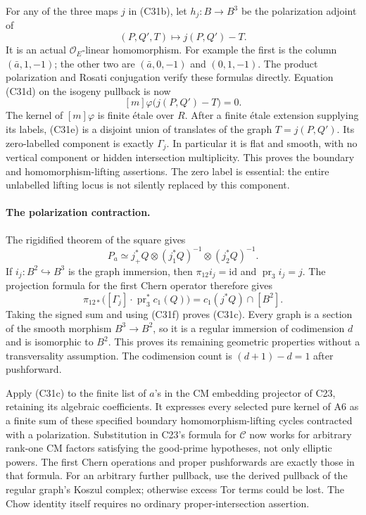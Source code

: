 For any of the three maps $j$ in (C31b), let
$h_j:B\to B^3$ be the polarization adjoint of
\[
                 (P,Q',T)\longmapsto j(P,Q')-T.
\]
It is an actual $\mathcal O_E$-linear homomorphism.
For example the first is the column $(\bar a,1,-1)$;
the other two are $(\bar a,0,-1)$ and $(0,1,-1)$.
The product polarization and Rosati conjugation verify
these formulas directly. Equation (C31d) on the isogeny
pullback is now
\[
               [m]\varphi\bigl(j(P,Q')-T\bigr)=0.
 \tag{C31e}
\]
The kernel of $[m]\varphi$ is finite \'etale over
$R$. After a finite \'etale extension supplying its
labels, (C31e) is a disjoint union of translates of the
graph $T=j(P,Q')$. Its zero-labelled component is exactly
$\Gamma_j$. In particular it is flat and smooth, with
no vertical component or hidden intersection multiplicity.
This proves the boundary and homomorphism-lifting assertions.
The zero label is essential: the entire unlabelled
lifting locus is not silently replaced by this component.

\paragraph{The polarization contraction.}
The rigidified theorem of the square gives
\[
 P_a\simeq j_+^*Q\otimes(j_1^*Q)^{-1}
                         \otimes(j_2^*Q)^{-1}.
 \tag{C31f}
\]
If $i_j:B^2\hookrightarrow B^3$ is the graph immersion,
then $\pi_{12}i_j=\mathrm{id}$ and
$\operatorname{pr}_3i_j=j$. The projection formula for
the first Chern operator therefore gives
\[
 \pi_{12*}\bigl([\Gamma_j]\cdot
                  \operatorname{pr}_3^*c_1(Q)\bigr)
     =c_1(j^*Q)\cap[B^2].
 \tag{C31g}
\]
Taking the signed sum and using (C31f) proves (C31c).
Every graph is a section of the smooth morphism
$B^3\to B^2$, so it is a regular immersion of codimension
$d$ and is isomorphic to $B^2$. This proves its remaining
geometric properties without a transversality assumption.
The codimension count is $(d+1)-d=1$ after pushforward.

Apply (C31c) to the finite list of $a$'s in the CM
embedding projector of C23, retaining its algebraic
coefficients. It expresses every selected pure kernel of
A6 as a finite sum of these specified boundary
homomorphism-lifting cycles contracted with a polarization.
Substitution in C23's formula for $\mathcal C$ now works
for arbitrary rank-one CM factors satisfying the good-prime
hypotheses, not only elliptic powers. The first Chern
operations and proper pushforwards are exactly those in
that formula. For an arbitrary further pullback, use the
derived pullback of the regular graph's Koszul complex;
otherwise excess Tor terms could be lost. The Chow identity
itself requires no ordinary proper-intersection assertion.

